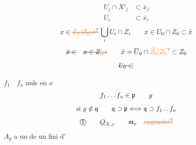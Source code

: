 \[
\begin{aligned}
U_j\cap X'_j&\subset\bar{x}_j\\
U_i&\subset\bar{x}_i
\end{aligned}
\]
\[
x\in\deleted{\unsure{Z_x|Z_0|\bar{x}}}\,\bigcup_i U_i\cap Z_i
\qquad x\in U_0\cap Z_0\subset\bar{x}
\]
\[
\deleted{\bar{x}\in}\quad\deleted{x\in Z_{\unsure{0|{}}}}
\qquad \bar{x}=\overline{U}_0\cap\unsure{\widetilde{Z}_0|Z_0}\subset Z_0
\]
\[\deleted{U_0\subset}\]

$f_1\quad f_n$ nuls en $x$
\[
f_1 \mathinner{\ldotp\ldotp\ldotp} f_n\in\mathfrak p\qquad g
\]
\[
\text{si } g\notin\mathfrak q \qquad \mathfrak q\supset\mathfrak p \Longleftrightarrow
\mathfrak q\supset f_1\mathinner{\ldotp\ldotp} f_n
\]
\[
\text{\textcircled{1}}\qquad \underline{O}_{X,x}\qquad
\mathfrak m_x\quad\deleted{\unsure{\text{engendré}}}
\]
$A_g$ a un  de \qquad
{}   un  fini d'

